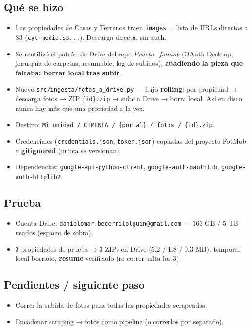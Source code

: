 \documentclass[11pt]{article}
\newcommand{\codigo}[1]{\texttt{#1}}
\newcommand{\pend}{\item[\textcolor{acento}{$\square$}]}
\begin{document}
\subsection*{Qué se hizo}
\begin{itemize}
  \item Las propiedades de Casas y Terrenos traen \codigo{images} = lista de URLs
        directas a S3 (\codigo{cyt-media.s3...}). Descarga directa, sin auth.
  \item Se reutilizó el patrón de Drive del repo \textit{Prueba\_fotmob} (OAuth
        Desktop, jerarquía de carpetas, resumable, log de subidos), \textbf{añadiendo
        la pieza que faltaba: borrar local tras subir}.
  \item Nuevo \codigo{src/ingesta/fotos\_a\_drive.py} — flujo \textbf{rolling}: por
        propiedad → descarga fotos → ZIP \codigo{\{id\}.zip} → sube a Drive → borra
        local. Así en disco nunca hay más que una propiedad a la vez.
  \item Destino: \codigo{Mi unidad / CIMENTA / \{portal\} / fotos / \{id\}.zip}.
  \item Credenciales (\codigo{credentials.json}, \codigo{token.json}) copiadas del
        proyecto FotMob y \textbf{gitignored} (nunca se versionan).
  \item Dependencias: \codigo{google-api-python-client},
        \codigo{google-auth-oauthlib}, \codigo{google-auth-httplib2}.
\end{itemize}

\subsection*{Prueba}
\begin{itemize}
  \item Cuenta Drive: \codigo{danielomar.becerrilolguin@gmail.com} — 163 GB /
        5 TB usados (espacio de sobra).
  \item 3 propiedades de prueba → 3 ZIPs en Drive (5.2 / 1.8 / 0.3 MB),
        temporal local borrado, \textbf{resume} verificado (re-correr salta los 3).
\end{itemize}

\subsection*{Pendientes / siguiente paso}
\begin{itemize}
  \pend Correr la subida de fotos para todas las propiedades scrapeadas.
  \pend Encadenar scraping → fotos como pipeline (o correrlos por separado).
\end{itemize}
\end{document}
